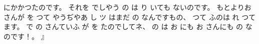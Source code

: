 にかかつたのです。
それを
でしやう
の
は
り
いても
ないのです。
もとよりお
さんが
を
つて
やうぢやあ
し
ツ
はまだ
の
なんですもの、
つて
ふのは
れ
つて
ます。
で
の
さんていふ
が
を
たのでしてネ、
の
は
お
にも
お
さんにも
の
なのです！。
』

